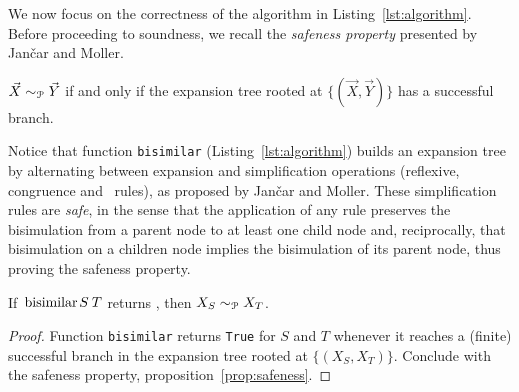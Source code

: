 We now focus on the correctness of the algorithm in
Listing~\ref{lst:algorithm}.  Before proceeding to soundness, we
recall the \emph{safeness property} presented by Jan{\v{c}}ar and
Moller.

\begin{proposition} 
  \label{prop:safeness}
  $\vec X \sim_\mathcal P \vec Y$ if and only if the expansion tree rooted
  at $\{(\vec X, \vec Y)\}$ has a successful branch.
\end{proposition}

Notice that function \lstinline|bisimilar|
(Listing~\ref{lst:algorithm}) builds an expansion tree by alternating
between expansion and simplification operations (reflexive,
congruence and \BPA\ rules), as proposed by Jan{\v{c}}ar and Moller.
%
These simplification rules are \emph{safe}, in the sense that the
application of any rule preserves the bisimulation from a parent node
to at least one child node and, reciprocally, that bisimulation on a
children node implies the bisimulation of its parent node, thus proving
the safeness property.


\begin{theorem}
  If $\bisimf S T$ returns , then
  $X_{S} \sim_\mathcal P X_{T}$.
\end{theorem}

\begin{proof}
  Function \lstinline|bisimilar| returns \lstinline|True| for $S$ and
  $T$ whenever it reaches a (finite) successful branch in the expansion
  tree rooted at $\{(X_{S}, X_{T})\}$. Conclude with the safeness property,
  proposition~\ref{prop:safeness}.
\end{proof}

